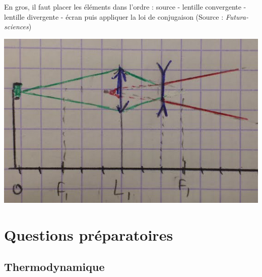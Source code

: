 \documentclass	[11pt, a4paper, openany]{book}
\begin{document}
En gros, il faut placer les éléments dans l'ordre : source - lentille convergente - lentille divergente - écran puis appliquer la loi de conjugaison (Source : \textit{Futura-sciences})
\begin{center}
\includegraphics[scale=0.5]{labo/image33.png}
\end{center}















































\chapter{Questions préparatoires}
\section{Thermodynamique}
\newcommand{\quest}[3]{#1. \textbf{#3} (p.#2)}
\end{document}

